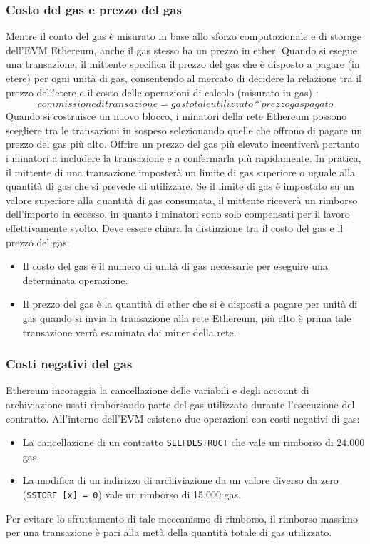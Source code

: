 \subsubsection{Costo del gas e prezzo del gas}
Mentre il conto del gas è misurato in base allo sforzo computazionale e di storage dell'EVM Ethereum, anche il gas stesso ha un prezzo in ether. Quando si esegue una transazione, il mittente specifica il prezzo del gas che è disposto a pagare (in etere) per ogni unità di gas, consentendo al mercato di decidere la relazione tra il prezzo dell'etere e il costo delle operazioni di calcolo (misurato in gas) :
%
\[ commissione di transazione = gas totale utilizzato * prezzo gas pagato \]
%
Quando si costruisce un nuovo blocco, i minatori della rete Ethereum possono scegliere tra le transazioni in sospeso selezionando quelle che offrono di pagare un prezzo del gas più alto. Offrire un prezzo del gas più elevato incentiverà pertanto i minatori a includere la transazione e a confermarla più rapidamente. In pratica, il mittente di una transazione imposterà un limite di gas superiore o uguale alla quantità di gas che si prevede di utilizzare. Se il limite di gas è impostato su un valore superiore alla quantità di gas consumata, il mittente riceverà un rimborso dell'importo in eccesso, in quanto i minatori sono solo compensati per il lavoro effettivamente svolto. Deve essere chiara la distinzione tra il costo del gas e il prezzo del gas:
\begin{itemize}
	\item Il costo del gas è il numero di unità di gas necessarie per eseguire una determinata operazione.
	\item Il prezzo del gas è la quantità di ether che si è disposti a pagare per unità di gas quando si invia la transazione alla rete Ethereum, più alto è prima tale transazione verrà esaminata dai miner della rete.
\end{itemize}

\subsubsection{Costi negativi del gas}
Ethereum incoraggia la cancellazione delle variabili e degli account di archiviazione usati rimborsando parte del gas utilizzato durante l'esecuzione del contratto. All'interno dell'EVM esistono due operazioni con costi negativi di gas:
\begin{itemize}
	\item La cancellazione di un contratto \lstinline|SELFDESTRUCT| che vale un rimborso di 24.000 gas.
	\item La modifica di un indirizzo di archiviazione da un valore diverso da zero (\lstinline|SSTORE [x] = 0|) vale un rimborso di 15.000 gas.
\end{itemize}
Per evitare lo sfruttamento di tale meccanismo di rimborso, il rimborso massimo per una transazione è pari alla metà della quantità totale di gas utilizzato.

